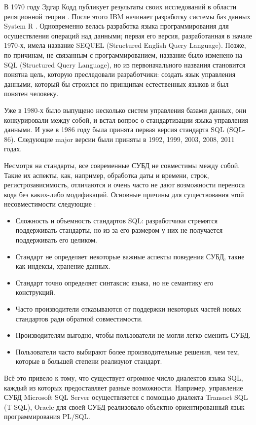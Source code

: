 В 1970 году Эдгар Кодд публикует результаты своих исследований в области реляционной теории \cite{codd}. После этого IBM начинает разработку системы баз данных System R \cite{wiki_codd}. Одновременно велась разработка языка программирования для осуществления операций над данными; первая его версия, разработанная в начале 1970-х, имела название SEQUEL (Structured English Query Language). Позже, по причинам, не связанным с программированием, название было изменено на SQL (Structured Query Language), но из первоначального названия становится понятна цель, которую преследовали разработчики: создать язык управления данными, который бы строился по принципам естественных языков и был понятен человеку.

Уже в 1980-х было выпущено несколько систем управления базами данных, они конкурировали между собой, и встал вопрос о стандартизации языка управления данными. И уже в 1986 году была принята первая версия стандарта SQL (SQL-86). Следующие major версии были приняты в 1992, 1999, 2003, 2008, 2011 годах. 

Несмотря на стандарты, все современные СУБД не совместимы между собой. Такие их аспекты, как, например, обработка даты и времени, строк, регистрозависимость, отличаются и очень часто не дают возможности переноса кода без каких-либо модификаций. Основные причины для существования этой несовместимости следующие \cite{wiki_sql}:
\begin{itemize}
	\item Сложность и объемность стандартов SQL: разработчики стремятся поддерживать стандарты, но из-за его размером у них не получается поддерживать его целиком.
	\item Стандарт не определяет некоторые важные аспекты поведения СУБД, такие как индексы, хранение данных.
	\item Стандарт точно определяет синтаксис языка, но не семантику его конструкций.
	\item Часто производители отказываются от поддержки некоторых частей новых стандартов ради обратной совместимости.
	\item Производителям выгодно, чтобы пользователи не могли легко сменить СУБД.
	\item Пользователи часто выбирают более производительные решения, чем тем, которые в большей степени реализуют стандарт.
\end{itemize}

Всё это привело к тому, что существует огромное число диалектов языка SQL, каждый из которых предоставляет разные возможности. Например, управление СУБД Microsoft SQL Server осуществляется с помощью диалекта Transact SQL (T-SQL), Oracle для своей СУБД реализовало объектно-ориентированный язык программирования PL/SQL.

